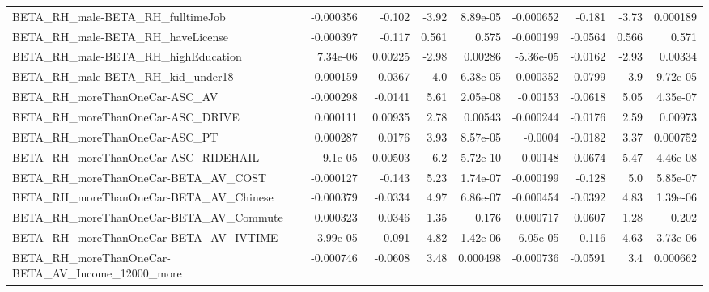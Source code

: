 \begin{tabular}{lrrrrrrrr}
BETA\_RH\_male-BETA\_RH\_fulltimeJob                   &   -0.000356 &       -0.102 &     -3.92 & 8.89e-05 &  -0.000652 &      -0.181 &        -3.73 &      0.000189 \\
BETA\_RH\_male-BETA\_RH\_haveLicense                   &   -0.000397 &       -0.117 &     0.561 &    0.575 &  -0.000199 &     -0.0564 &        0.566 &         0.571 \\
BETA\_RH\_male-BETA\_RH\_highEducation                 &    7.34e-06 &      0.00225 &     -2.98 &  0.00286 &  -5.36e-05 &     -0.0162 &        -2.93 &       0.00334 \\
BETA\_RH\_male-BETA\_RH\_kid\_under18                   &   -0.000159 &      -0.0367 &      -4.0 & 6.38e-05 &  -0.000352 &     -0.0799 &         -3.9 &      9.72e-05 \\
BETA\_RH\_moreThanOneCar-ASC\_AV                      &   -0.000298 &      -0.0141 &      5.61 & 2.05e-08 &   -0.00153 &     -0.0618 &         5.05 &      4.35e-07 \\
BETA\_RH\_moreThanOneCar-ASC\_DRIVE                   &    0.000111 &      0.00935 &      2.78 &  0.00543 &  -0.000244 &     -0.0176 &         2.59 &       0.00973 \\
BETA\_RH\_moreThanOneCar-ASC\_PT                      &    0.000287 &       0.0176 &      3.93 & 8.57e-05 &    -0.0004 &     -0.0182 &         3.37 &      0.000752 \\
BETA\_RH\_moreThanOneCar-ASC\_RIDEHAIL                &    -9.1e-05 &     -0.00503 &       6.2 & 5.72e-10 &   -0.00148 &     -0.0674 &         5.47 &      4.46e-08 \\
BETA\_RH\_moreThanOneCar-BETA\_AV\_COST                &   -0.000127 &       -0.143 &      5.23 & 1.74e-07 &  -0.000199 &      -0.128 &          5.0 &      5.85e-07 \\
BETA\_RH\_moreThanOneCar-BETA\_AV\_Chinese             &   -0.000379 &      -0.0334 &      4.97 & 6.86e-07 &  -0.000454 &     -0.0392 &         4.83 &      1.39e-06 \\
BETA\_RH\_moreThanOneCar-BETA\_AV\_Commute             &    0.000323 &       0.0346 &      1.35 &    0.176 &   0.000717 &      0.0607 &         1.28 &         0.202 \\
BETA\_RH\_moreThanOneCar-BETA\_AV\_IVTIME              &   -3.99e-05 &       -0.091 &      4.82 & 1.42e-06 &  -6.05e-05 &      -0.116 &         4.63 &      3.73e-06 \\
BETA\_RH\_moreThanOneCar-BETA\_AV\_Income\_12000\_more   &   -0.000746 &      -0.0608 &      3.48 & 0.000498 &  -0.000736 &     -0.0591 &          3.4 &      0.000662 \\

\end{tabular}
